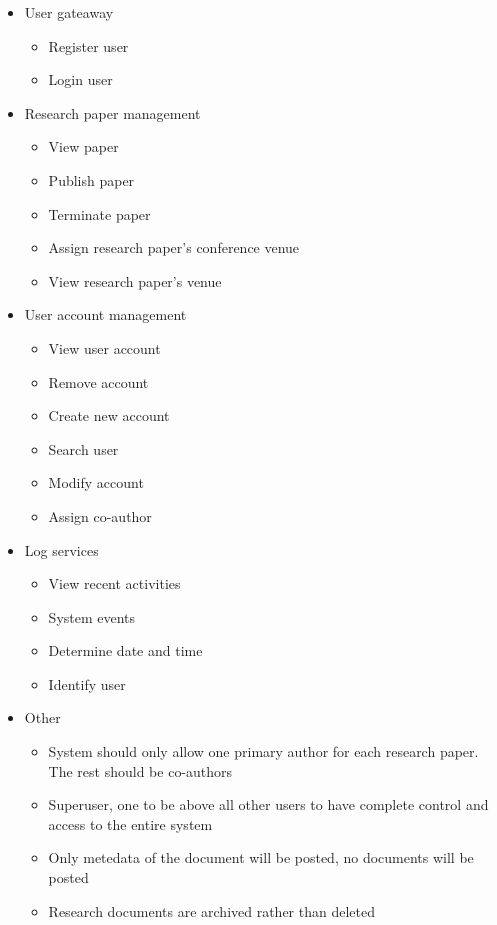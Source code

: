 \documentclass[11pt]{article}
\begin{document}
	\begin{itemize}
		\item User gateaway
		\begin{itemize}
			\item Register user
			\item Login user
		\end{itemize}
		\item Research paper management
		\begin{itemize}
			\item View paper
			\item Publish paper
			\item Terminate paper
			\item Assign research paper's conference venue
			\item View research paper's venue
		\end{itemize}
		\item User account management
		\begin{itemize}
			\item View user account
			\item Remove account
			\item Create new account
			\item Search user
			\item Modify account
			\item Assign co-author
		\end{itemize}
		\item Log services
		\begin{itemize}
			\item View recent activities
			\item System events
			\item Determine date and time
			\item Identify user
		\end{itemize}
		\item Other
		\begin{itemize}
			\item System should only allow one primary author for each research paper. The rest should be co-authors
			\item Superuser, one to be above all other users to have complete control and access to the entire system
			\item Only metedata of the document will be posted, no documents will be posted
			\item Research documents are archived rather than deleted
		\end{itemize}
		
	\end{itemize}
	
\end{document}
